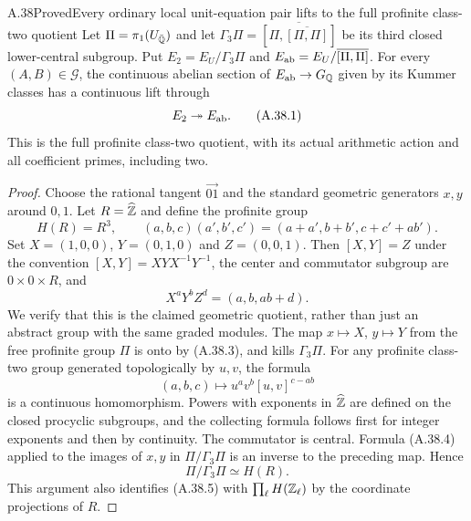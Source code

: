 \begin{statement}{A.38}{Proved}{Every ordinary local unit-equation pair lifts to the full profinite class-two quotient}
Let $\Pi=\pi_1(U_{\bar{\mathbb Q}})$ and let
$\Gamma_3\Pi=\overline{[\Pi,\overline{[\Pi,\Pi]}]}$ be its third
closed lower-central subgroup.  Put $E_2=E_U/\Gamma_3\Pi$ and
$E_{\rm ab}=E_U/\overline{[\Pi,\Pi]}$.
For every $(A,B)\in\mathcal G$, the continuous abelian section
of $E_{\rm ab}\to G_\mathbb Q$ given by its Kummer classes has a
continuous lift through
\[
                       E_2\twoheadrightarrow E_{\rm ab}.     \tag{A.38.1}
\]
This is the full profinite class-two quotient, with its actual
arithmetic action and all coefficient primes, including two.
\end{statement}
\begin{proof}
Choose the rational tangent $\overrightarrow{01}$ and the standard
geometric generators $x,y$ around $0,1$.  Let $R=\widehat{\mathbb Z}$ and
define the profinite group
\[
 H(R)=R^3,\qquad
 (a,b,c)(a',b',c')=(a+a',b+b',c+c'+ab').                         \tag{A.38.2}
\]
Set $X=(1,0,0)$, $Y=(0,1,0)$ and $Z=(0,0,1)$.
Then $[X,Y]=Z$ under the convention $[X,Y]=XYX^{-1}Y^{-1}$,
the center and commutator subgroup are $0\times0\times R$, and
\[
                     X^aY^bZ^d=(a,b,ab+d).                    \tag{A.38.3}
\]
We verify that this is the claimed geometric quotient, rather than
just an abstract group with the same graded modules.  The map
$x\mapsto X$, $y\mapsto Y$ from the free profinite group $\Pi$
is onto by (A.38.3), and kills $\Gamma_3\Pi$.
For any profinite class-two group generated topologically by $u,v$,
the formula
\[
 (a,b,c)\longmapsto u^a v^b[u,v]^{c-ab}                        \tag{A.38.4}
\]
is a continuous homomorphism.  Powers with exponents in
$\widehat{\mathbb Z}$ are defined on the closed procyclic subgroups, and
the collecting formula follows first for integer exponents and
then by continuity.  The commutator is central.  Formula (A.38.4)
applied to the images of $x,y$ in $\Pi/\Gamma_3\Pi$ is an inverse
to the preceding map.  Hence
\[
                         \Pi/\Gamma_3\Pi\simeq H(R).          \tag{A.38.5}
\]
This argument also identifies (A.38.5) with
$\prod_\ell H(\mathbb Z_\ell)$ by the coordinate projections of $R$.


\end{proof}
